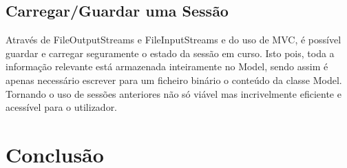 \documentclass[10pt, a4paper]{article}
\begin{document}
\subsection{Carregar/Guardar uma Sessão}
        Através de FileOutputStreams e FileInputStreams e do uso de MVC, é possível guardar e carregar seguramente o estado da sessão em curso.
        Isto pois, toda a informação relevante está armazenada inteiramente no Model, sendo assim é apenas necessário escrever para um ficheiro binário o
        conteúdo da classe Model. Tornando o uso de sessões anteriores não só viável mas incrivelmente eficiente e acessível para o utilizador.



\newpage
\section{Conclusão}
\lipsum[1]
\end{document}
